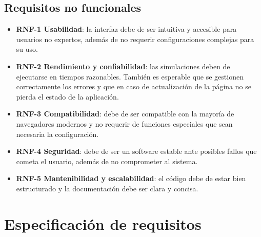 \subsection{Requisitos no funcionales}
\label{subsec:RequisitosNoFuncionales}
\begin{itemize}
    \item \textbf{RNF-1 Usabilidad}: la interfaz debe de ser intuitiva y accesible para usuarios no expertos, además de no requerir configuraciones complejas para su uso.
    \item \textbf{RNF-2 Rendimiento y confiabilidad}: las simulaciones deben de ejecutarse en tiempos razonables. También es esperable que se gestionen correctamente los errores y que en caso de actualización de la página no se pierda el estado de la aplicación.
    \item \textbf{RNF-3 Compatibilidad}: debe de ser compatible con la mayoría de navegadores modernos y no requerir de funciones especiales que sean necesaria la configuración.
    \item \textbf{RNF-4 Seguridad}: debe de ser un software estable ante posibles fallos que cometa el usuario, además de no comprometer al sistema.
    \item \textbf{RNF-5 Mantenibilidad y escalabilidad}: el código debe de estar bien estructurado y la documentación debe ser clara y concisa.
\end{itemize}

\section{Especificación de requisitos}
\label{sec:EspecificacionRequisitos}

\newpage

